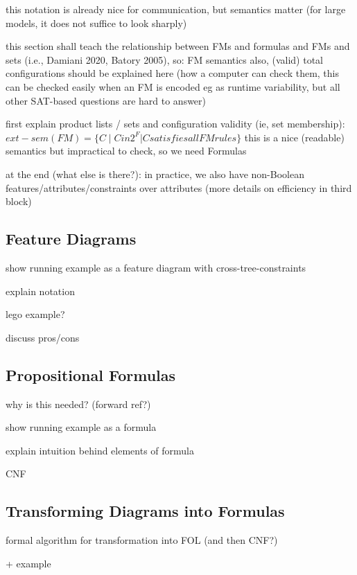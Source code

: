this notation is already nice for communication, but semantics matter (for large models, it does not suffice to look sharply)

this section shall teach the relationship between FMs and formulas and FMs and sets (i.e., Damiani 2020, Batory 2005), so: FM semantics
also, (valid) total configurations should be explained here (how a computer can check them, this can be checked easily when an FM is encoded eg as runtime variability, but all other SAT-based questions are hard to answer)

first explain product lists / sets and configuration validity (ie, set membership):
$ext-sem (FM) = \{ C \mid C in 2^F | C satisfies all FM rules \}$
this is a nice (readable) semantics but impractical to check, so we need Formulas


at the end (what else is there?): in practice, we also have non-Boolean features/attributes/constraints over attributes (more details on efficiency in third block)





\subsection{Feature Diagrams}

show running example as a feature diagram with cross-tree-constraints

explain notation

lego example?

discuss pros/cons

\subsection{Propositional Formulas}

why is this needed? (forward ref?)

show running example as a formula

explain intuition behind elements of formula

CNF

\subsection{Transforming Diagrams into Formulas}

formal algorithm for transformation into FOL (and then CNF?)

+ example


